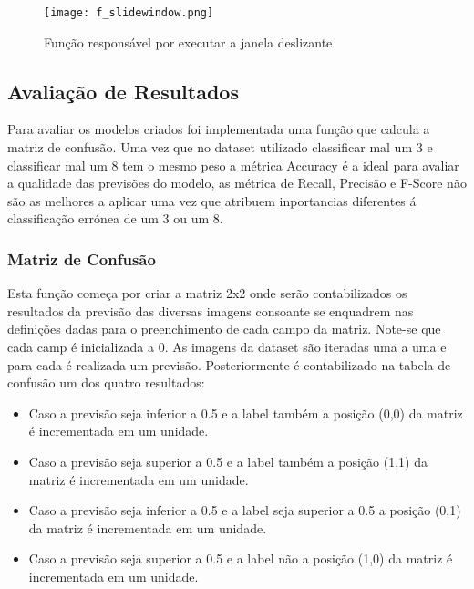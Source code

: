 	\begin{figure}[H]

	  \centering
	  \captionsetup{justification=centering}

	  \texttt{[image: f\_slidewindow.png]}
	  
	  \caption {Função responsável por executar a janela deslizante}
	\end{figure}


\subsection{Avaliação de Resultados}

Para avaliar os modelos criados foi implementada uma função que calcula a matriz de confusão. Uma vez que no dataset utilizado classificar mal um 3 e classificar mal um 8 tem o mesmo peso a métrica Accuracy é a ideal para avaliar a qualidade das previsões do modelo, as métrica de Recall, Precisão e F-Score não são as melhores a aplicar uma vez que atribuem inportancias diferentes á classificação errónea de um 3 ou um 8.

\subsubsection{Matriz de Confusão}\hfill\newline
\hfill\newline

Esta função começa por criar a matriz 2x2 onde serão contabilizados os resultados da previsão das diversas imagens consoante se enquadrem nas definições dadas para o preenchimento de cada campo da matriz. Note-se que cada camp é inicializada a 0.\newline
As imagens da dataset são iteradas uma a uma e para cada é realizada um previsão. Posteriormente é contabilizado na tabela de confusão um dos quatro resultados:
\begin{itemize}
  \item Caso a previsão seja inferior a 0.5 e a label também a posição (0,0) da matriz é incrementada em um unidade.
  \item Caso a previsão seja superior a 0.5 e a label também a posição (1,1) da matriz é incrementada em um unidade.
  \item Caso a previsão seja inferior a 0.5 e a label seja superior a 0.5 a posição (0,1) da matriz é incrementada em um unidade.
  \item Caso a previsão seja superior a 0.5 e a label não a posição (1,0) da matriz é incrementada em um unidade.
\end{itemize}

